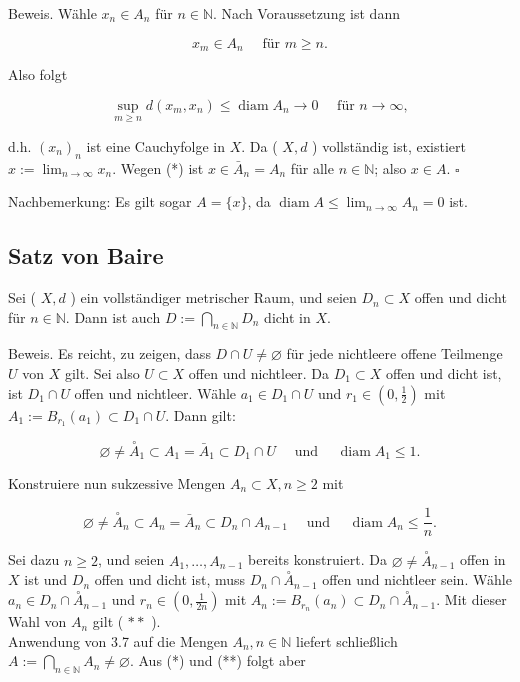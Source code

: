 \documentclass[10pt, letterpaper]{article}
\begin{document}
Beweis. Wähle $x_{n} \in A_{n}$ für $n \in \mathbb{N}$. Nach Voraussetzung ist dann

$$
x_{m} \in A_{n} \quad \text { für } m \geq n .
$$

Also folgt

$$
\sup _{m \geq n} d\left(x_{m}, x_{n}\right) \leq \operatorname{diam} A_{n} \rightarrow 0 \quad \text { für } n \rightarrow \infty,
$$

d.h. $\left(x_{n}\right)_{n}$ ist eine Cauchyfolge in $X$. Da ( $X, d$ ) vollständig ist, existiert $x:=\lim _{n \rightarrow \infty} x_{n}$. Wegen (*) ist $x \in \bar{A}_{n}=A_{n}$ für alle $n \in \mathbb{N}$; also $x \in A$. \(\square\)

Nachbemerkung: Es gilt sogar $A=\{x\}$, da $\operatorname{diam} A \leq \lim _{n \rightarrow \infty} A_{n}=0$ ist.

\subsection*{Satz von Baire}
Sei ( $X, d$ ) ein vollständiger metrischer Raum, und seien $D_{n} \subset X$ offen und dicht für $n \in \mathbb{N}$. Dann ist auch $D:=\bigcap_{n \in \mathbb{N}} D_{n}$ dicht in $X$.

Beweis. Es reicht, zu zeigen, dass $D \cap U \neq \varnothing$ für jede nichtleere offene Teilmenge $U$ von $X$ gilt. Sei also $U \subset X$ offen und nichtleer. Da $D_{1} \subset X$ offen und dicht ist, ist $D_{1} \cap U$ offen und nichtleer. Wähle $a_{1} \in D_{1} \cap U$ und $r_{1} \in\left(0, \frac{1}{2}\right)$ mit $A_{1}:=B_{r_{1}}\left(a_{1}\right) \subset D_{1} \cap U$. Dann gilt:

$$
\varnothing \neq \stackrel{\circ}{A}_{1} \subset A_{1}=\bar{A}_{1} \subset D_{1} \cap U \quad \text { und } \quad \operatorname{diam} A_{1} \leq 1 .
$$

Konstruiere nun sukzessive Mengen $A_{n} \subset X, n \geq 2$ mit

$$
\varnothing \neq \stackrel{\circ}{A}_{n} \subset A_{n}=\bar{A}_{n} \subset D_{n} \cap A_{n-1} \quad \text { und } \quad \operatorname{diam} A_{n} \leq \frac{1}{n} .
$$

Sei dazu $n \geq 2$, und seien $A_{1}, \ldots, A_{n-1}$ bereits konstruiert. Da $\varnothing \neq \stackrel{\circ}{A}_{n-1}$ offen in $X$ ist und $D_{n}$ offen und dicht ist, muss $D_{n} \cap \stackrel{\circ}{A}_{n-1}$ offen und nichtleer sein. Wähle $a_{n} \in D_{n} \cap \stackrel{\circ}{A}_{n-1}$ und $r_{n} \in\left(0, \frac{1}{2 n}\right)$ mit $A_{n}:=B_{r_{n}}\left(a_{n}\right) \subset D_{n} \cap \stackrel{\circ}{A}_{n-1}$. Mit dieser Wahl von $A_{n}$ gilt ( $* *$ ).\\
Anwendung von 3.7 auf die Mengen $A_{n}, n \in \mathbb{N}$ liefert schließlich $A:=\bigcap_{n \in \mathbb{N}} A_{n} \neq \varnothing$. Aus (*) und (**) folgt aber
\end{document}

